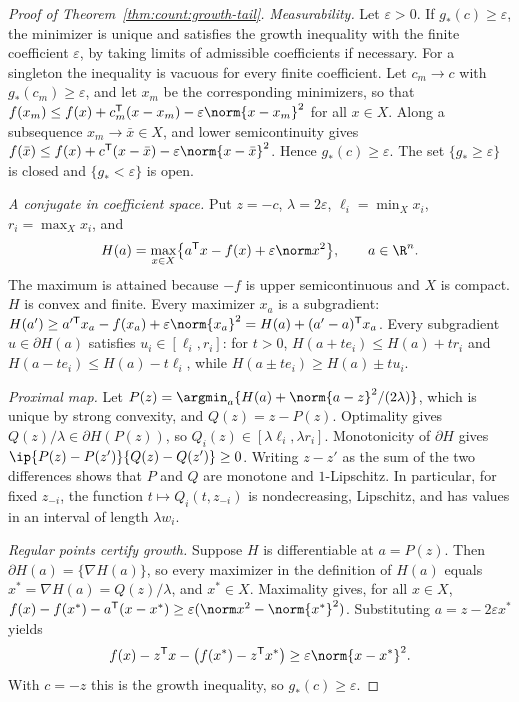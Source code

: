 \begin{proof}[Proof of Theorem~\ref{thm:count:growth-tail}]
\emph{Measurability.} Let $\varepsilon>0$. If $g_*(c)\ge\varepsilon$, the
minimizer is unique and satisfies the growth inequality with the finite
coefficient $\varepsilon$, by taking limits of admissible coefficients if
necessary. For a singleton the inequality is vacuous for every finite
coefficient. Let $c_m\to c$ with $g_*(c_m)\ge\varepsilon$, and let $x_m$ be the
corresponding minimizers, so that
$f(x_m)\le f(x)+c_m^{\mathsf T}(x-x_m)-\varepsilon\norm{x-x_m}^2$ for all $x\in X$.
Along a subsequence $x_m\to\bar x\in X$, and lower semicontinuity gives
$f(\bar x)\le f(x)+c^{\mathsf T}(x-\bar x)-\varepsilon\norm{x-\bar x}^2$. Hence
$g_*(c)\ge\varepsilon$. The set $\{g_*\ge\varepsilon\}$ is closed and
$\{g_*<\varepsilon\}$ is open.

\emph{A conjugate in coefficient space.} Put $z=-c$, $\lambda=2\varepsilon$,
$\ell_i=\min_Xx_i$, $r_i=\max_Xx_i$, and
\[
 H(a)=\max_{x\in X}\bigl\{a^{\mathsf T} x-f(x)+\varepsilon\norm x^2\bigr\},
 \qquad a\in\R^n .
\]
The maximum is attained because $-f$ is upper semicontinuous and $X$ is
compact. $H$ is convex and finite. Every maximizer $x_a$ is a subgradient:
$H(a')\ge a'^{\mathsf T} x_a-f(x_a)+\varepsilon\norm{x_a}^2=H(a)+(a'-a)^{\mathsf T} x_a$.
Every subgradient $u\in\partial H(a)$ satisfies $u_i\in[\ell_i,r_i]$: for
$t>0$, $H(a+te_i)\le H(a)+tr_i$ and $H(a-te_i)\le H(a)-t\ell_i$, while
$H(a\pm te_i)\ge H(a)\pm tu_i$.

\emph{Proximal map.} Let
$P(z)=\argmin_a\{H(a)+\norm{a-z}^2/(2\lambda)\}$, which is unique by strong
convexity, and $Q(z)=z-P(z)$. Optimality gives $Q(z)/\lambda\in\partial H(P(z))$,
so $Q_i(z)\in[\lambda\ell_i,\lambda r_i]$. Monotonicity of $\partial H$ gives
$\ip{P(z)-P(z')}{Q(z)-Q(z')}\ge0$. Writing $z-z'$ as the sum of the two
differences shows that $P$ and $Q$ are monotone and $1$-Lipschitz. In
particular, for fixed $z_{-i}$, the function $t\mapsto Q_i(t,z_{-i})$ is
nondecreasing, Lipschitz, and has values in an interval of length
$\lambda w_i$.

\emph{Regular points certify growth.} Suppose $H$ is differentiable at
$a=P(z)$. Then $\partial H(a)=\{\nabla H(a)\}$, so every maximizer in the
definition of $H(a)$ equals $x^*=\nabla H(a)=Q(z)/\lambda$, and $x^*\in X$.
Maximality gives, for all $x\in X$,
$f(x)-f(x^*)-a^{\mathsf T}(x-x^*)\ge\varepsilon(\norm x^2-\norm{x^*}^2)$. Substituting
$a=z-2\varepsilon x^*$ yields
\[
 f(x)-z^{\mathsf T} x-\bigl(f(x^*)-z^{\mathsf T} x^*\bigr)\ge\varepsilon\norm{x-x^*}^2 .
\]
With $c=-z$ this is the growth inequality, so $g_*(c)\ge\varepsilon$.


\end{proof}
